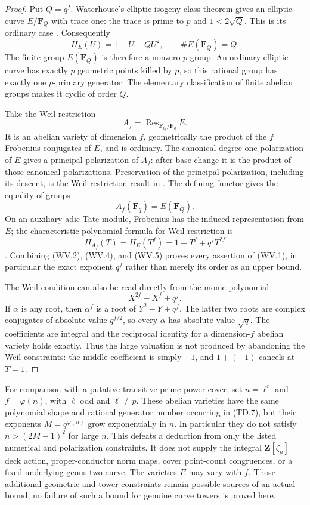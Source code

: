 \begin{proof}
Put $Q=q^f$. Waterhouse's elliptic isogeny-class theorem gives
an elliptic curve $E/\mathbf F_Q$ with trace one: the trace is
prime to $p$ and $1<2\sqrt Q$. This is its ordinary case
\cite[Theorem~4.1(1), pp.~536--538; Corollary~4.4, p.~540]{Waterhouse1969AV}.
Consequently
\[
       H_E(U)=1-U+QU^2,
       \qquad \#E(\mathbf F_Q)=Q.
 \tag{WV.2}
\]
The finite group $E(\mathbf F_Q)$ is therefore a nonzero
$p$-group. An ordinary elliptic curve has exactly $p$ geometric
points killed by $p$, so this rational group has exactly one
$p$-primary generator. The elementary classification of finite
abelian groups makes it cyclic of order $Q$.

Take the Weil restriction
\[
               A_f=\operatorname{Res}_{\mathbf F_Q/\mathbf F_q}E.
 \tag{WV.3}
\]
It is an abelian variety of dimension $f$, geometrically the
product of the $f$ Frobenius conjugates of $E$, and is ordinary.
The canonical degree-one polarization of $E$ gives a principal
polarization of $A_f$: after base change it is the product of
those canonical polarizations. Preservation of the principal
polarization, including its descent, is the Weil-restriction
result in \cite[Proposition~1.22, pp.~27--28]{Diem2001Weil}.
The defining functor gives the equality of groups
\[
                  A_f(\mathbf F_q)=E(\mathbf F_Q).
 \tag{WV.4}
\]
On an auxiliary-adic Tate module, Frobenius has the induced
representation from $E$; the characteristic-polynomial formula
for Weil restriction is
\[
                  H_{A_f}(T)=H_E(T^f)
                              =1-T^f+q^fT^{2f}
 \tag{WV.5}
\]
\cite[Proposition~1.21, p.~26]{Diem2001Weil}.
Combining (WV.2), (WV.4), and (WV.5) proves every assertion
of (WV.1), in particular the exact exponent $q^f$ rather than
merely its order as an upper bound.

The Weil condition can also be read directly from the monic
polynomial
\[
                    X^{2f}-X^f+q^f.
 \tag{WV.6}
\]
If $\alpha$ is any root, then $\alpha^f$ is a root of
$Y^2-Y+q^f$. The latter two roots are complex conjugates of
absolute value $q^{f/2}$, so every $\alpha$ has absolute value
$\sqrt q$. The coefficients are integral and the reciprocal
identity for a dimension-$f$ abelian variety holds exactly.
Thus the large valuation is not produced by abandoning the
Weil constraints: the middle coefficient is simply $-1$,
and $1+(-1)$ cancels at $T=1$.
\end{proof}

For comparison with a putative transitive prime-power cover,
set $n=\ell^r$ and $f=\varphi(n)$, with $\ell$ odd and
$\ell\ne p$. These abelian varieties have the same polynomial
shape and rational generator number occurring in (TD.7), but
their exponents $M=q^{\varphi(n)}$ grow exponentially in $n$.
In particular they do not satisfy $n>(2M-1)^2$ for large $n$.
This defeats a deduction from only the listed numerical and
polarization constraints. It does not supply the integral
$\mathbf Z[\zeta_n]$ deck action, proper-conductor norm maps,
cover point-count congruences, or a fixed underlying genus-two
curve. The varieties $E$ may vary with $f$. Those additional
geometric and tower constraints remain possible sources of an
actual bound; no failure of such a bound for genuine curve
towers is proved here.
